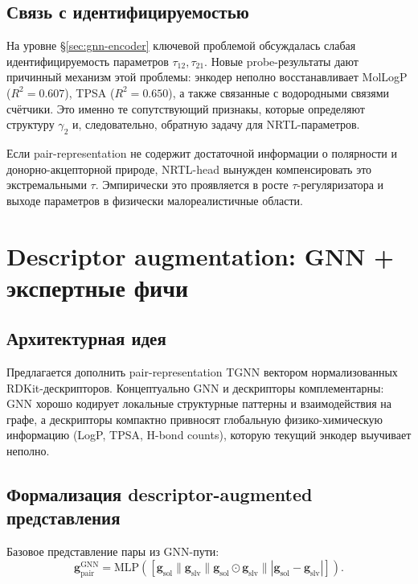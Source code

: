 \documentclass[11pt]{article}
\begin{document}
\subsection{Связь с идентифицируемостью}

На уровне §\ref{sec:gnn-encoder} ключевой проблемой обсуждалась слабая идентифицируемость параметров $\tau_{12},\tau_{21}$. Новые probe-результаты дают причинный механизм этой проблемы: энкодер неполно восстанавливает MolLogP ($R^2=0.607$), TPSA ($R^2=0.650$), а также связанные с водородными связями счётчики. Это именно те сопутствующий признакы, которые определяют структуру $\gamma_2$ и, следовательно, обратную задачу для NRTL-параметров.

Если pair-representation не содержит достаточной информации о полярности и донорно-акцепторной природе, NRTL-head вынужден компенсировать это экстремальными $\tau$. Эмпирически это проявляется в росте $\tau$-регуляризатора и выходе параметров в физически малореалистичные области.

\section{Descriptor augmentation: GNN + экспертные фичи}

\subsection{Архитектурная идея}

Предлагается дополнить pair-representation TGNN вектором нормализованных RDKit-дескрипторов. Концептуально GNN и дескрипторы комплементарны: GNN хорошо кодирует локальные структурные паттерны и взаимодействия на графе, а дескрипторы компактно привносят глобальную физико-химическую информацию (LogP, TPSA, H-bond counts), которую текущий энкодер выучивает неполно.

\subsection{Формализация descriptor-augmented представления}

Базовое представление пары из GNN-пути:
\begin{equation*}
\mathbf{g}_{\mathrm{pair}}^{\mathrm{GNN}} = \mathrm{MLP}\left([
\mathbf{g}_{\mathrm{sol}} \| \mathbf{g}_{\mathrm{slv}} \|
\mathbf{g}_{\mathrm{sol}} \odot \mathbf{g}_{\mathrm{slv}} \|
|\mathbf{g}_{\mathrm{sol}} - \mathbf{g}_{\mathrm{slv}}|]
\right).
\end{equation*}
\end{document}
